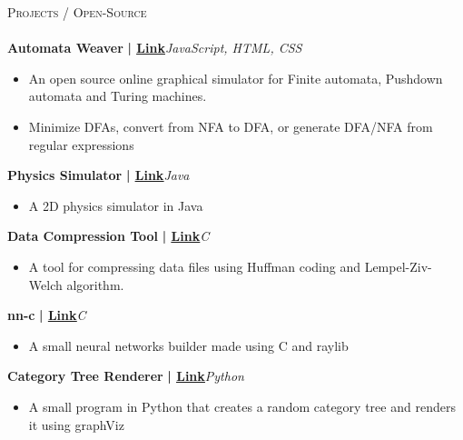 \documentclass[a4paper]{article}
\newcommand{\lineunder} {
    \vspace*{-8pt} \\
    \hspace*{-18pt} \hrulefill \\
}
\newcommand{\header} [1] {
    {\hspace*{-18pt}\vspace*{6pt} \textsc{#1}}
    \vspace*{-6pt} \lineunder
}
\begin{document}
      \header{Projects / Open-Source}
      \vspace{2mm}
      {\textbf{Automata Weaver}}\textbf{ | \href{https://github.com/syedhuzaif199/automata-weaver}{\underline{Link}}}\hfill{\sl JavaScript, HTML, CSS}\\
          \vspace{-1mm}
\begin{itemize} \itemsep -3pt
\item  An open source online graphical simulator for Finite automata, Pushdown automata and Turing machines.
\item  Minimize DFAs, convert from NFA to DFA, or generate DFA/NFA from regular expressions
\end{itemize}
          \vspace*{3mm}
      {\textbf{Physics Simulator}}\textbf{ | \href{https://github.com/syedhuzaif199/physics-simulator}{\underline{Link}}}\hfill{\sl Java}\\
          \vspace{-1mm}
\begin{itemize} \itemsep -3pt
\item[] A 2D physics simulator in Java
\end{itemize}
          \vspace*{3mm}
      {\textbf{Data Compression Tool}}\textbf{ | \href{https://github.com/syedhuzaif199/data-compression-tool}{\underline{Link}}}\hfill{\sl C}\\
          \vspace{-1mm}
\begin{itemize} \itemsep -3pt
\item[] A tool for compressing data files using Huffman coding and Lempel-Ziv-Welch algorithm.
\end{itemize}
          \vspace*{3mm}
      {\textbf{nn-c}}\textbf{ | \href{https://github.com/syedhuzaif199/nn-c}{\underline{Link}}}\hfill{\sl C}\\
          \vspace{-1mm}
\begin{itemize} \itemsep -3pt
\item[] A small neural networks builder made using C and raylib
\end{itemize}
          \vspace*{3mm}
      {\textbf{Category Tree Renderer}}\textbf{ | \href{https://github.com/syedhuzaif199/category-tree}{\underline{Link}}}\hfill{\sl Python}\\
          \vspace{-1mm}
\begin{itemize} \itemsep -3pt
\item[] A small program in Python that creates a random category tree and renders it using graphViz
\end{itemize}
\end{document}
